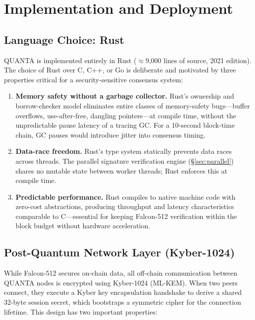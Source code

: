 \documentclass[11pt,a4paper]{article}
\begin{document}
\section{Implementation and Deployment}
\label{sec:implementation}

\subsection{Language Choice: Rust}

QUANTA is implemented entirely in Rust ($\approx$9,000 lines of source, 2021
edition). The choice of Rust over C, C++, or Go is deliberate and motivated by
three properties critical for a security-sensitive consensus system:

\begin{enumerate}
  \item \textbf{Memory safety without a garbage collector.} Rust's ownership
        and borrow-checker model eliminates entire classes of memory-safety
        bugs---buffer overflows, use-after-free, dangling pointers---at compile
        time, without the unpredictable pause latency of a tracing GC. For a
        10-second block-time chain, GC pauses would introduce jitter into
        consensus timing.
  \item \textbf{Data-race freedom.} Rust's type system statically prevents data
        races across threads. The parallel signature verification engine
        (\S\ref{sec:parallel}) shares no mutable state between worker threads;
        Rust enforces this at compile time.
  \item \textbf{Predictable performance.} Rust compiles to native machine code
        with zero-cost abstractions, producing throughput and latency
        characteristics comparable to C---essential for keeping Falcon-512
        verification within the block budget without hardware acceleration.
\end{enumerate}

\subsection{Post-Quantum Network Layer (Kyber-1024)}
\label{subsec:kyberimpl}

While Falcon-512 secures on-chain data, all off-chain communication between
QUANTA nodes is encrypted using Kyber-1024 (ML-KEM). When two peers connect,
they execute a Kyber key encapsulation handshake to derive a shared 32-byte
session secret, which bootstraps a symmetric cipher for the connection
lifetime. This design has two important properties:
\end{document}
